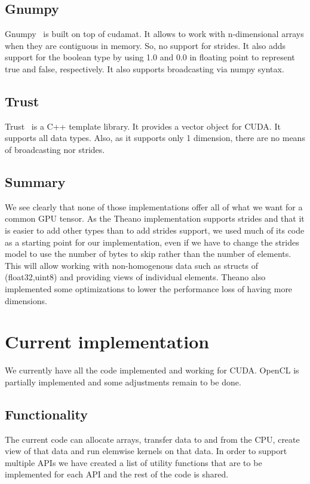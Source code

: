 \documentclass{article} %
\begin{document}
\subsection{Gnumpy}
Gnumpy~\citep{gnumpy-TR2010} is built on top of cudamat. It allows to work with n-dimensional arrays when they are contiguous in memory. So, no support for strides. It also adds support for the boolean type by using 1.0 and 0.0 in floating point to represent true and false, respectively. It also supports broadcasting via numpy syntax.

\subsection{Trust}
Trust~\citep{Thrust} is a C++ template library. It provides a vector object for CUDA. It supports all data types.  Also, as it supports only 1 dimension, there are no means of broadcasting nor strides.

\subsection{Summary}
We see clearly that none of those implementations offer all of what we want for a common GPU tensor. As the Theano implementation supports strides and that it is easier to add other types than to add strides support, we used much of its code as a starting point for our implementation, even if we have to change the strides model to use the number of bytes to skip rather than the number of elements.  This will allow working with non-homogenous data such as structs of (float32,uint8) and providing views of individual elements. Theano also implemented some optimizations to lower the performance loss of having more dimensions.

\section{Current implementation}

We currently have all the code implemented and working for CUDA.
OpenCL is partially implemented and some adjustments remain to be done.

\subsection{Functionality}

The current code can allocate arrays, transfer data to and from the CPU, create view of that data and run elemwise kernels on that data.  In order to support multiple APIs we have created a list of utility functions that are to be implemented for each API and the rest of the code is shared.
\end{document}
